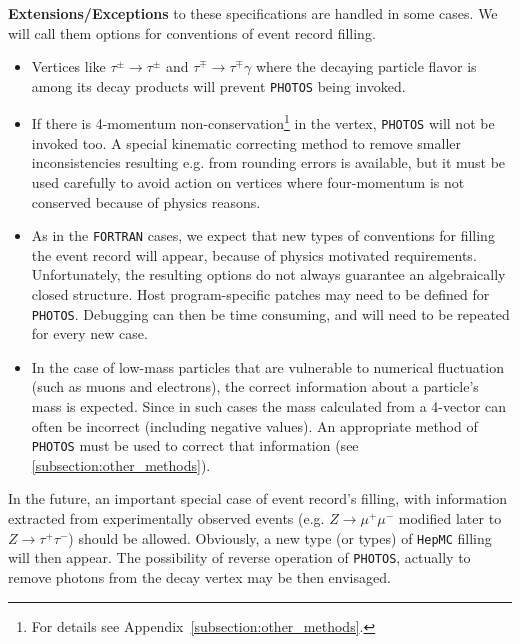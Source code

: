 \documentclass[]{Photos_interface_design}
\begin{document}
\noindent
\textbf{ Extensions/Exceptions} to these specifications are handled in some cases. We will call them
options for conventions of event record filling.
  \begin{itemize} 
    \item  Vertices like $\tau^\pm \rightarrow \tau^\pm$ and $\tau^\mp \rightarrow \tau^\mp \gamma$ 
           where the decaying particle flavor is among its decay products will prevent  {\tt PHOTOS} being invoked.

    \item  If there is  4-momentum non-conservation\footnote{For details see 
           Appendix~\ref{subsection:other_methods}.} in the vertex,
           {\tt PHOTOS} will not be invoked too.  A special kinematic correcting
           method to remove smaller inconsistencies resulting e.g. from 
           rounding errors is available, but it must be used carefully to avoid
           action on vertices where four-momentum is not conserved because 
           of physics reasons.

    \item
           As in the {\tt FORTRAN} cases, we expect that  new  types of 
           conventions for filling the event record
           will appear, because of physics motivated requirements.
           Unfortunately, the resulting options do not always guarantee
           an algebraically closed structure.  
           Host program-specific patches may need to be defined for
           {\tt PHOTOS}. 
           Debugging can then be time consuming, and will need to be repeated for every new
           case.
           
    \item  In the case of low-mass particles that are vulnerable to numerical fluctuation (such as muons and electrons),
           the correct information about a particle's mass is expected. Since in such cases the mass calculated
           from a 4-vector can often be incorrect (including negative values). An appropriate method
           of {\tt PHOTOS} must be used to correct that information (see \ref{subsection:other_methods}).
   \end{itemize}


 In the future,  an important special case of event record's filling, with
information extracted from experimentally observed events (e.g. $Z\to \mu^+\mu^-$
 modified later to $Z\to \tau^+\tau^-$) should be allowed.
  Obviously, a new type (or types) of {\tt HepMC} filling will then appear.
The possibility of reverse operation of {\tt PHOTOS}, actually to remove 
photons from the decay vertex
may be then envisaged.
\end{document}
